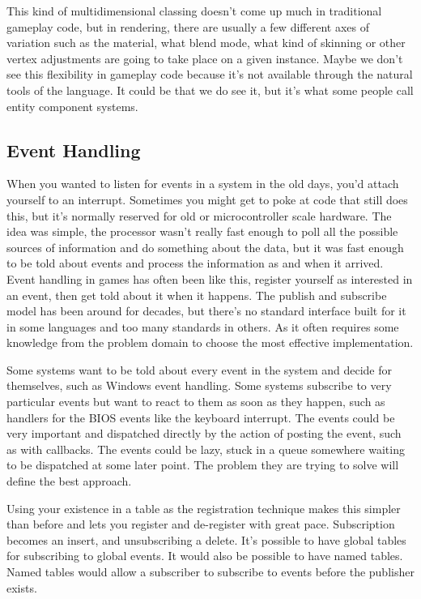 \documentclass[a4paper,12pt]{article}
\begin{document}
This kind of multidimensional classing doesn't come up much in traditional gameplay code, but in rendering, there are usually a few different axes of variation such as the material, what blend mode, what kind of skinning or other vertex adjustments are going to take place on a given instance.
Maybe we don't see this flexibility in gameplay code because it's not available through the natural tools of the language.
It could be that we do see it, but it's what some people call entity component systems.

\subsection{Event Handling}

When you wanted to listen for events in a system in the old days, you'd attach yourself to an interrupt.
Sometimes you might get to poke at code that still does this, but it's normally reserved for old or microcontroller scale hardware.
The idea was simple, the processor wasn't really fast enough to poll all the possible sources of information and do something about the data, but it was fast enough to be told about events and process the information as and when it arrived.
Event handling in games has often been like this, register yourself as interested in an event, then get told about it when it happens.
The publish and subscribe model has been around for decades, but there's no standard interface built for it in some languages and too many standards in others.
As it often requires some knowledge from the problem domain to choose the most effective implementation.

Some systems want to be told about every event in the system and decide for themselves, such as Windows event handling.
Some systems subscribe to very particular events but want to react to them as soon as they happen, such as handlers for the BIOS events like the keyboard interrupt.
The events could be very important and dispatched directly by the action of posting the event, such as with callbacks.
The events could be lazy, stuck in a queue somewhere waiting to be dispatched at some later point.
The problem they are trying to solve will define the best approach.

Using your existence in a table as the registration technique makes this simpler than before and lets you register and de-register with great pace.
Subscription becomes an insert, and unsubscribing a delete.
It's possible to have global tables for subscribing to global events.
It would also be possible to have named tables.
Named tables would allow a subscriber to subscribe to events before the publisher exists.
\end{document}
